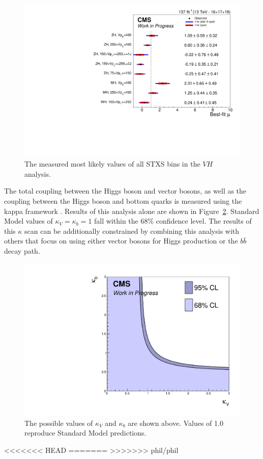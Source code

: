 \begin{figure}
  \centering
  \includegraphics[width=0.8\linewidth]{figures/210308_STXSfine_400split_unblinded_Xbb_8f854f5a_a866aef8/summary_stxs.pdf}
  \caption[Measured STXS values of $V\!H$]{
    The measured most likely values of all STXS bins in the
    $V\!H$ analysis.
  }
  \label{fig:vh-stxs}
\end{figure}

The total coupling between the Higgs boson and vector bosons, as well as the coupling between
the Higgs boson and bottom quarks is measured using the kappa framework \cite{de_Blas_2020}.
Results of this analysis alone are shown in Figure~\ref{fig:kappa}.
Standard Model values of $\kappa_V = \kappa_b = 1$ fall within the 68\% confidence level.
The results of this $\kappa$ scan can be additionally constrained by combining
this analysis with others that focus on using either vector bosons for Higgs production
or the $b\bar{b}$ decay path.

\begin{figure}
  \centering
  \includegraphics[width=0.7\linewidth]{figures/limit.pdf}
  \caption[Measured values of $\kappa_V$ and $\kappa_b$]{
    The possible values of $\kappa_V$ and $\kappa_b$ are shown above.
    Values of 1.0 reproduce Standard Model predictions.
  }
  \label{fig:kappa}
\end{figure}

<<<<<<< HEAD
=======
>>>>>>> phil/phil
